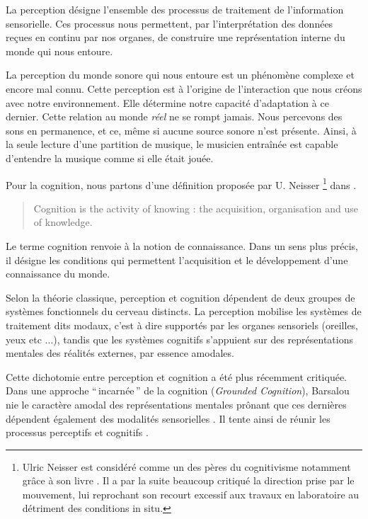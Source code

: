 La perception désigne l'ensemble des processus de traitement de l'information sensorielle. Ces processus nous permettent, par l'interprétation des données reçues en continu par nos organes, de construire une représentation interne du monde qui nous entoure.

La perception du monde sonore qui nous entoure est un phénomène complexe et encore mal connu. Cette perception est à l'origine de l'interaction que nous créons avec notre environnement. Elle détermine notre capacité d'adaptation à ce dernier. Cette relation au monde \emph{réel} ne se rompt jamais. Nous percevons des sons en permanence, et ce, même si aucune source sonore n'est présente. Ainsi, à la seule lecture d'une partition de musique, le musicien entraînée est capable d'entendre la musique comme si elle était jouée.

Pour la cognition, nous partons d'une définition proposée par U. Neisser \footnote{Ulric Neisser est considéré comme un des pères du cognitivisme notamment grâce à son livre \citep{neisser1967cognitive}. Il a par la suite beaucoup critiqué la direction prise par le mouvement, lui reprochant son recourt excessif aux travaux en laboratoire au détriment des conditions in situ.} dans \citep[p. ??]{neisser1976cognition} .

\begin{quote}
Cognition is the activity of knowing : the acquisition, organisation and use of knowledge.
\end{quote}

Le terme cognition renvoie à la notion de connaissance. Dans un sens plus précis, il désigne les conditions qui permettent l'acquisition et le développement d'une connaissance du monde.

Selon la théorie classique, perception et cognition dépendent de deux groupes de systèmes fonctionnels du cerveau distincts. La perception mobilise les systèmes de traitement dits modaux, c'est à dire supportés par les organes sensoriels (oreilles, yeux etc $\ldots$), tandis que les systèmes cognitifs s'appuient sur des représentations mentales des réalités externes, par essence amodales.

Cette dichotomie entre perception et cognition a été plus récemment critiquée. Dans une approche ``\,incarnée\,'' de la cognition (\emph{Grounded Cognition}), Barsalou nie le caractère amodal des représentations mentales prônant que ces dernières dépendent également des modalités sensorielles \citep{barsalou2010grounded}. Il tente ainsi de réunir les processus perceptifs et cognitifs \citep{goldstone1998reuniting, barsalou1999perceptions}. 

